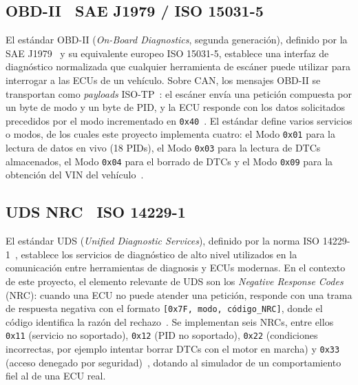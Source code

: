 \subsection{OBD-II \textemdash\ SAE J1979 / ISO 15031-5}

El estándar OBD-II (\textit{On-Board Diagnostics}, segunda generación), definido por 
la SAE J1979~\cite{SAE-J1979-12} y su equivalente europeo ISO 15031-5, establece una 
interfaz de diagnóstico normalizada que cualquier herramienta de escáner puede 
utilizar para interrogar a las ECUs de un vehículo. Sobre CAN, los mensajes OBD-II se 
transportan como \textit{payloads} ISO-TP~\cite{ISO15765-2-16}: el escáner envía una 
petición compuesta por un byte de modo y un byte de PID, y la ECU responde con los 
datos solicitados precedidos por el modo incrementado en 
\texttt{0x40}~\cite{SAE-J1979-12}. El estándar define varios servicios o modos, de 
los cuales este proyecto implementa cuatro: el Modo \texttt{0x01} para la lectura de 
datos en vivo (18 PIDs), el Modo \texttt{0x03} para la lectura de DTCs almacenados, 
el Modo \texttt{0x04} para el borrado de DTCs y el Modo \texttt{0x09} para la 
obtención del VIN del vehículo~\cite{SAE-J1979-12}.


\subsection{UDS NRC \textemdash\ ISO 14229-1}

El estándar UDS (\textit{Unified Diagnostic Services}), definido por la norma 
ISO 14229-1~\cite{ISO14229-1-20}, establece los servicios de diagnóstico de alto 
nivel utilizados en la comunicación entre herramientas de diagnosis y ECUs modernas. 
En el contexto de este proyecto, el elemento relevante de UDS son los 
\textit{Negative Response Codes} (NRC): cuando una ECU no puede atender una 
petición, responde con una trama de respuesta negativa con el formato 
\texttt{[0x7F, modo, código\_NRC]}, donde el código identifica la razón del 
rechazo~\cite{ISO14229-1-20}. Se implementan seis NRCs, entre ellos \texttt{0x11} 
(servicio no soportado), \texttt{0x12} (PID no soportado), \texttt{0x22} 
(condiciones incorrectas, por ejemplo intentar borrar DTCs con el motor en marcha) y 
\texttt{0x33} (acceso denegado por seguridad)~\cite{ISO14229-1-20}, dotando al 
simulador de un comportamiento fiel al de una ECU real.